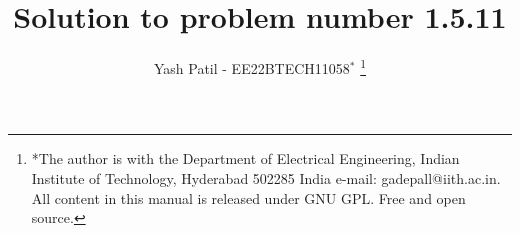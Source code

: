\documentclass[journal,12pt,twocolumn]{IEEEtran}
\theoremstyle{remark}
\begin{document}
%




\vspace{3cm}

\title{
    Solution to problem number 1.5.11
}
\author{ Yash Patil - EE22BTECH11058$^{*}$%
	\thanks{*The author is with the Department
		of Electrical Engineering, Indian Institute of Technology, Hyderabad
		502285 India e-mail:  gadepall@iith.ac.in. All content in this manual is released under GNU GPL.  Free and open source.}	
}


%
%
%

% 
%



% 
\end{document}
